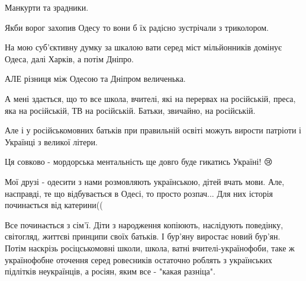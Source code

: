 \begin{itemize}
 
Манкурти та зрадники.

Якби ворог захопив Одесу то вони б їх радісно зустрічали з триколором.

На мою суб'єктивну думку за шкалою вати серед міст мільйонників домінує Одеса,
далі Харків, а потім Дніпро.

АЛЕ різниця між Одесою та Дніпром величенька.

 

А мені здається, що то все школа, вчителі, які на перервах на російській,
преса, яка на російській, ТВ на російській. Батьки, звичайно, на російській.

Але і у російськомовних батьків при правильній освіті можуть вирости патріоти і
Українці з великої літери.


 
Ця совково - мордорська ментальність ще довго буде гикатись Україні! 😢

 

Мої друзі - одесити з нами розмовляють українською, дітей вчать мови. Але,
насправді, те що відбувається в Одесі, то просто розпач... Для них історія
починається від катерини((

 

Все починається з сім'ї. Діти з народження копіюють, наслідують поведінку,
світогляд, життєві принципи своїх батьків. І бур'яну виростає новий бур'ян.
Потім наскрізь росіцськомовні школи, школа, ватні вчителі-українофоби, таке ж
українофобне оточення серед ровесників остаточно роблять з українських
підлітків неукраїнців, а росіян, яким все - "какая разніца". 🙈🙈🙈
\end{itemize}

